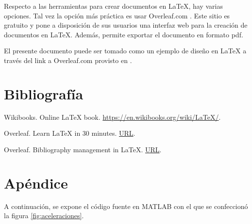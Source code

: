 \documentclass{article}
\begin{document}
Respecto a las herramientas para crear documentos en \LaTeX{}, hay varias opciones. Tal vez la opción más práctica es usar Overleaf.com \cite{Overleaf2019}. Este sitio es gratuito y pone a disposición de sus usuarios una interfaz web para la creación de documentos en \LaTeX. Además, permite exportar el documento en formato pdf.

El presente documento puede ser tomado como un ejemplo de diseño en \LaTeX{} a través del link a Overleaf.com provisto en \cite{Gonzalez2019}.


\section*{Bibliografía}

Wikibooks. Online \LaTeX{} book. \href{https://en.wikibooks.org/wiki/LaTeX/}{https://en.wikibooks.org/wiki/LaTeX/}.

Overleaf. Learn LaTeX in 30 minutes. \href{https://www.overleaf.com/learn/latex/Learn_LaTeX_in_30_minutes}{URL}. 

Overleaf. Bibliography management in LaTeX. \href{https://www.overleaf.com/learn/latex/Bibliography_management_in_LaTeX}{URL}. 








\section*{Apéndice}

A continuación, se expone el código fuente en MATLAB con el que se confeccionó la figura \ref{fig:aceleraciones}.

\inputminted{matlab}{figura_ejemplo.m}
\end{document}
